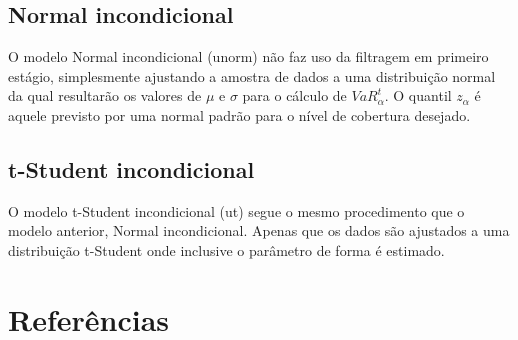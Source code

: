 \documentclass[review]{elsarticle}
\theoremstyle{definition}
\begin{document}
\subsection{Normal incondicional}

O modelo Normal incondicional (unorm) não faz uso da filtragem em primeiro estágio, simplesmente ajustando a amostra de dados a uma distribuição normal da qual resultarão os valores de $\mu$ e $\sigma$ para o cálculo de $VaR^t_\alpha$. O quantil $z_\alpha$ é aquele previsto por uma normal padrão para o nível de cobertura desejado. 

\subsection{t-Student incondicional}

O modelo t-Student incondicional (ut) segue o mesmo procedimento que o modelo anterior, Normal incondicional. Apenas que os dados são ajustados a uma distribuição t-Student onde inclusive o parâmetro de forma é estimado.

\section*{Referências}


\end{document}
